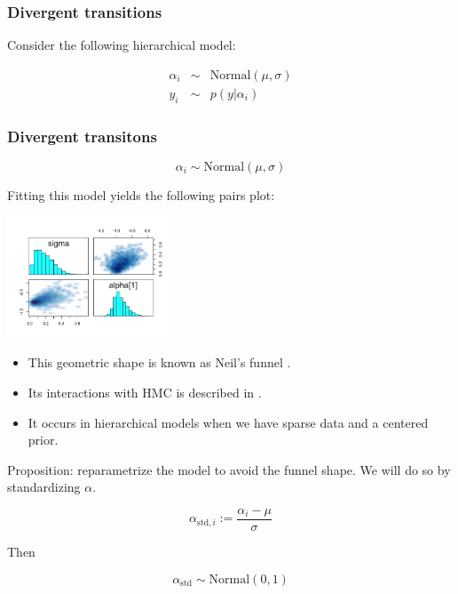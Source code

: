 \documentclass[xcolor=table]{beamer}
\begin{document}
\begin{frame}
  \frametitle{Divergent transitions}
  
  Consider the following hierarchical model:

  \begin{eqnarray*}
    \alpha_i &\sim& \mathrm{Normal}(\mu, \sigma)  \\
    y_i &\sim& p(y | \alpha_i)
  \end{eqnarray*}

\end{frame}

\begin{frame}
  \frametitle{Divergent transitons}
  
  $$ \alpha_i \sim \mathrm{Normal}(\mu, \sigma) $$
  
  Fitting this model yields the following pairs plot:

  \begin{center}
    \includegraphics[width=5cm]{../figures/pairs_baseball2.png}
  \end{center}

\end{frame}

\begin{frame}

  \begin{itemize}
    \item This geometric shape is known as Neil's funnel \cite{Neil:2003}.
    \item Its interactions with HMC is described in \cite{Betancourt:2015}.
    \item It occurs in hierarchical models when we have sparse data and
    a centered prior.
  \end{itemize}

\end{frame}

\begin{frame}
  
  Proposition: reparametrize the model to avoid the funnel shape.
  We will do so by standardizing $\alpha$.
  
  $$ \alpha_{\mathrm{std}, i} := \frac{\alpha_i - \mu}{\sigma} $$
  
  Then
  
  $$ \alpha_\mathrm{std} \sim \mathrm{Normal}(0, 1)  $$
  
\end{frame}
\end{document}

